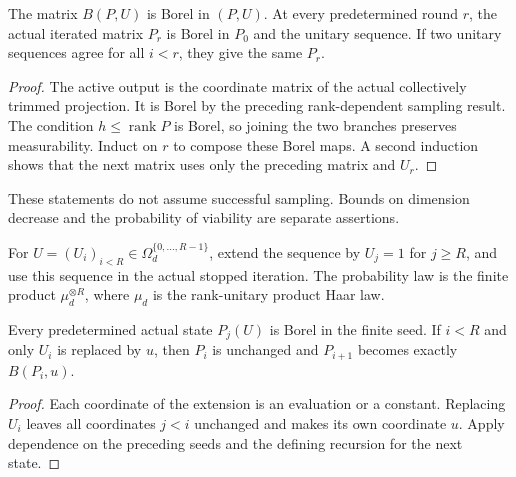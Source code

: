 \begin{lemma}
    \label{lem:canonical_stopped_half_sample_iteration_borel}
    \leanok
    The matrix $B(P,U)$ is Borel in $(P,U)$. At every predetermined
    round $r$, the actual iterated matrix $P_r$ is Borel in $P_0$
    and the unitary sequence. If two unitary sequences agree for all
    $i<r$, they give the same $P_r$.
\end{lemma}
\begin{proof}\leanok
    The active output is the coordinate matrix of the actual
    collectively trimmed projection. It is Borel by the preceding
    rank-dependent sampling result. The condition
    $h\le\operatorname{rank}P$ is Borel, so joining the two branches
    preserves measurability. Induct on $r$ to compose these Borel maps.
    A second induction shows that the next matrix uses only the
    preceding matrix and $U_r$.
\end{proof}

These statements do not assume successful sampling. Bounds on dimension
decrease and the probability of viability are separate assertions.


\begin{definition}
    \label{def:finite_half_sampling_seed}
    \leanok
    For $U=(U_i)_{i<R}\in\Omega_d^{\{0,\ldots,R-1\}}$, extend the
    sequence by $U_j=1$ for $j\ge R$, and use this sequence in the actual
    stopped iteration. The probability law is the finite product
    $\mu_d^{\otimes R}$, where $\mu_d$ is the rank-unitary product Haar law.
\end{definition}

\begin{theorem}
    \label{thm:finite_half_sampling_seed_update}
    \leanok
    Every predetermined actual state $P_j(U)$ is Borel in the finite seed.
    If $i<R$ and only $U_i$ is replaced by $u$, then $P_i$ is unchanged
    and $P_{i+1}$ becomes exactly $B(P_i,u)$.
\end{theorem}
\begin{proof}\leanok
    Each coordinate of the extension is an evaluation or a constant.
    Replacing $U_i$ leaves all coordinates $j<i$ unchanged and makes its
    own coordinate $u$. Apply dependence on the preceding seeds and the
    defining recursion for the next state.
\end{proof}


